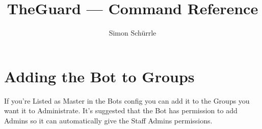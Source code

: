 \documentclass[a4paper]{article}
\title{TheGuard --- Command Reference}
\author{Simon Schürrle}
\begin{document}
\maketitle
\tableofcontents
\section{Adding the Bot to Groups}
If you're Listed as Master in the Bots config you can add it to the Groups you want it to Administrate. It's suggested that the Bot has permission to add Admins so it can automatically give the Staff Admins permissions.
\end{document}
